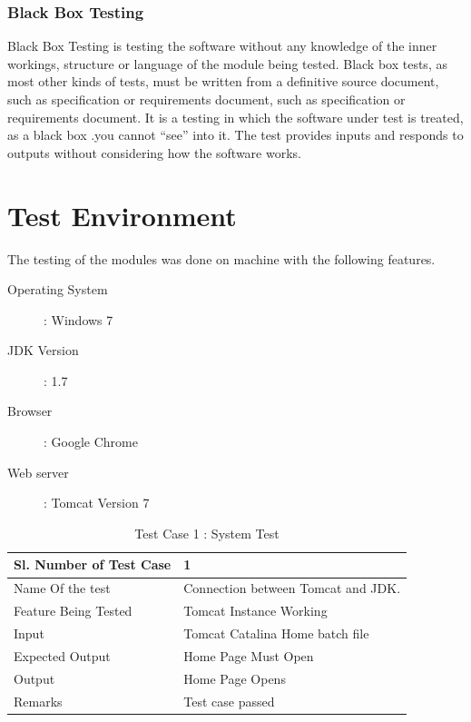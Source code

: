 \documentclass[12pt,a4paper]{report}
\begin{document}
\subsubsection{Black Box Testing}
Black Box Testing is testing the software without any knowledge of the inner
workings, structure or language of the module being tested. Black box tests, as most
other kinds of tests, must be written from a definitive source document, such as
specification or requirements document, such as specification or requirements
document. It is a testing in which the software under test is treated, as a black box
.you cannot “see” into it. The test provides inputs and responds to outputs without
considering how the software works.
\section{Test Environment}
The testing of the modules was done on machine with the following features.
\begin{description}
  \item[Operating System ] : Windows 7 
  \item[JDK Version ] : 1.7 
  \item[Browser ] : Google Chrome 
  \item[Web server ]: Tomcat Version 7 
\end{description}
\newpage


\begin{table}
    \begin{tabular}{|l|l|}
    \hline
    Sl. Number of Test Case & 1                                  \\ \hline
    Name Of the test        & Connection between Tomcat and JDK. \\ \hline
    Feature Being Tested    & Tomcat Instance Working            \\ \hline
    Input                   & Tomcat Catalina Home batch file    \\ \hline
    Expected Output         & Home Page Must Open                \\ \hline
    Output                  & Home Page Opens                    \\ \hline
    Remarks                 & Test case passed                   \\ \hline
    \end{tabular}
    \caption {Test Case 1 : System Test}
\end{table}
\end{document}
